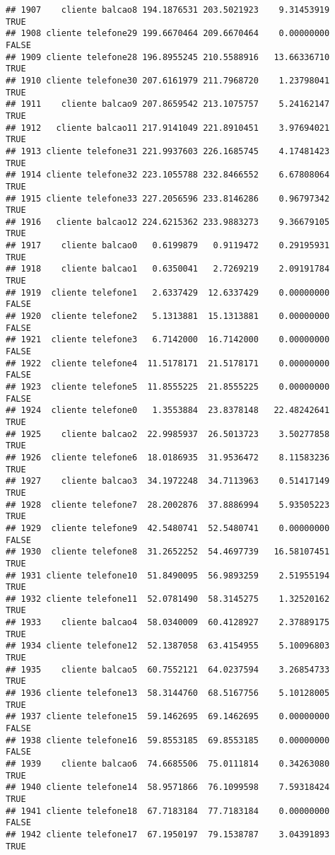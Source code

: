 \documentclass[
]{article}
\begin{document}
\begin{verbatim}
## 1907    cliente balcao8 194.1876531 203.5021923    9.31453919     TRUE
## 1908 cliente telefone29 199.6670464 209.6670464    0.00000000    FALSE
## 1909 cliente telefone28 196.8955245 210.5588916   13.66336710     TRUE
## 1910 cliente telefone30 207.6161979 211.7968720    1.23798041     TRUE
## 1911    cliente balcao9 207.8659542 213.1075757    5.24162147     TRUE
## 1912   cliente balcao11 217.9141049 221.8910451    3.97694021     TRUE
## 1913 cliente telefone31 221.9937603 226.1685745    4.17481423     TRUE
## 1914 cliente telefone32 223.1055788 232.8466552    6.67808064     TRUE
## 1915 cliente telefone33 227.2056596 233.8146286    0.96797342     TRUE
## 1916   cliente balcao12 224.6215362 233.9883273    9.36679105     TRUE
## 1917    cliente balcao0   0.6199879   0.9119472    0.29195931     TRUE
## 1918    cliente balcao1   0.6350041   2.7269219    2.09191784     TRUE
## 1919  cliente telefone1   2.6337429  12.6337429    0.00000000    FALSE
## 1920  cliente telefone2   5.1313881  15.1313881    0.00000000    FALSE
## 1921  cliente telefone3   6.7142000  16.7142000    0.00000000    FALSE
## 1922  cliente telefone4  11.5178171  21.5178171    0.00000000    FALSE
## 1923  cliente telefone5  11.8555225  21.8555225    0.00000000    FALSE
## 1924  cliente telefone0   1.3553884  23.8378148   22.48242641     TRUE
## 1925    cliente balcao2  22.9985937  26.5013723    3.50277858     TRUE
## 1926  cliente telefone6  18.0186935  31.9536472    8.11583236     TRUE
## 1927    cliente balcao3  34.1972248  34.7113963    0.51417149     TRUE
## 1928  cliente telefone7  28.2002876  37.8886994    5.93505223     TRUE
## 1929  cliente telefone9  42.5480741  52.5480741    0.00000000    FALSE
## 1930  cliente telefone8  31.2652252  54.4697739   16.58107451     TRUE
## 1931 cliente telefone10  51.8490095  56.9893259    2.51955194     TRUE
## 1932 cliente telefone11  52.0781490  58.3145275    1.32520162     TRUE
## 1933    cliente balcao4  58.0340009  60.4128927    2.37889175     TRUE
## 1934 cliente telefone12  52.1387058  63.4154955    5.10096803     TRUE
## 1935    cliente balcao5  60.7552121  64.0237594    3.26854733     TRUE
## 1936 cliente telefone13  58.3144760  68.5167756    5.10128005     TRUE
## 1937 cliente telefone15  59.1462695  69.1462695    0.00000000    FALSE
## 1938 cliente telefone16  59.8553185  69.8553185    0.00000000    FALSE
## 1939    cliente balcao6  74.6685506  75.0111814    0.34263080     TRUE
## 1940 cliente telefone14  58.9571866  76.1099598    7.59318424     TRUE
## 1941 cliente telefone18  67.7183184  77.7183184    0.00000000    FALSE
## 1942 cliente telefone17  67.1950197  79.1538787    3.04391893     TRUE

\end{verbatim}
\end{document}
